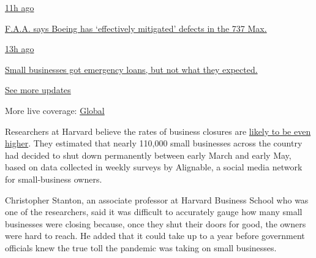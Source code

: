 \href{https://www.nytimes.com/live/2020/08/03/business/stock-market-today-coronavirus?action=click\&pgtype=Article\&state=default\&region=MAIN_CONTENT_1\&context=storylines_live_updates\#faa-says-boeing-has-effectively-mitigated-defects-in-the-737-max}{11h
ago}

\href{https://www.nytimes.com/live/2020/08/03/business/stock-market-today-coronavirus?action=click\&pgtype=Article\&state=default\&region=MAIN_CONTENT_1\&context=storylines_live_updates\#faa-says-boeing-has-effectively-mitigated-defects-in-the-737-max}{F.A.A.
says Boeing has `effectively mitigated' defects in the 737 Max.}

\href{https://www.nytimes.com/live/2020/08/03/business/stock-market-today-coronavirus?action=click\&pgtype=Article\&state=default\&region=MAIN_CONTENT_1\&context=storylines_live_updates\#small-businesses-got-emergency-loans-but-not-what-they-expected}{13h
ago}

\href{https://www.nytimes.com/live/2020/08/03/business/stock-market-today-coronavirus?action=click\&pgtype=Article\&state=default\&region=MAIN_CONTENT_1\&context=storylines_live_updates\#small-businesses-got-emergency-loans-but-not-what-they-expected}{Small
businesses got emergency loans, but not what they expected.}

\href{https://www.nytimes.com/live/2020/08/03/business/stock-market-today-coronavirus?action=click\&pgtype=Article\&state=default\&region=MAIN_CONTENT_1\&context=storylines_live_updates}{See
more updates}

More live coverage:
\href{https://www.nytimes.com/2020/08/03/world/coronavirus-covid-19.html?action=click\&pgtype=Article\&state=default\&region=MAIN_CONTENT_1\&context=storylines_live_updates}{Global}

Researchers at Harvard believe the rates of business closures are
\href{https://www.nber.org/papers/w26989.pdf}{likely to be even higher}.
They estimated that nearly 110,000 small businesses across the country
had decided to shut down permanently between early March and early May,
based on data collected in weekly surveys by Alignable, a social media
network for small-business owners.

Christopher Stanton, an associate professor at Harvard Business School
who was one of the researchers, said it was difficult to accurately
gauge how many small businesses were closing because, once they shut
their doors for good, the owners were hard to reach. He added that it
could take up to a year before government officials knew the true toll
the pandemic was taking on small businesses.

